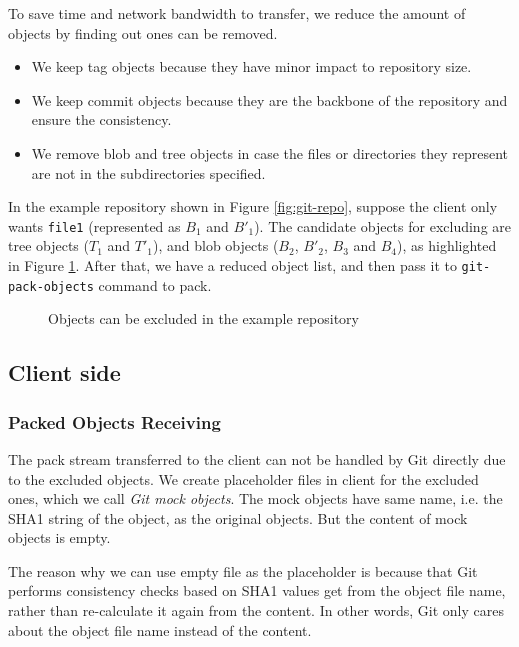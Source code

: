 \documentclass[preprint]{sigplanconf}
\begin{document}
To save time and network bandwidth to transfer, we reduce the amount of objects
by finding out ones can be removed.
\begin{itemize}
  \item We keep tag objects because they have minor impact to repository size.
  \item We keep commit objects because they are the backbone of the repository
    and ensure the consistency.
  \item We remove blob and tree objects in case the files or directories they
    represent are not in the subdirectories specified.
\end{itemize}

In the example repository shown in Figure \ref{fig:git-repo}, suppose the
client only wants \verb|file1| (represented as $B_1$ and $B'_1$).
The candidate objects for excluding are tree objects ($T_1$ and $T'_1$), and
blob objects ($B_2$, $B'_2$, $B_3$ and $B_4$), as highlighted in Figure
\ref{fig:find-obj-to-remove}.
After that, we have a reduced object list, and then pass it to
\verb|git-pack-objects| command to pack.
\begin{figure}[htpb]
  \centering
  
  \caption{Objects can be excluded in the example repository}
  \label{fig:find-obj-to-remove}
\end{figure}


\subsection{Client side}
\subsubsection{Packed Objects Receiving}
The pack stream transferred to the client can not be handled by Git directly due to the excluded objects.
We create placeholder files in client for the excluded ones, which we call \emph{Git mock objects}.
The mock objects have same name, i.e. the SHA1 string of the object, as the original objects.
But the content of mock objects is empty.

The reason why we can use empty file as the placeholder is because that Git performs consistency checks based on SHA1 values get from the object file name, rather than re-calculate it again from the content. In other words, Git only cares about the object file name instead of the content.
\end{document}
